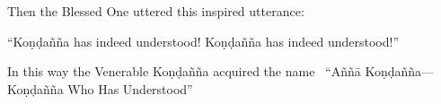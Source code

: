 \begin{english-only-hang}
  Then the Blessed One uttered this inspired utterance:
\end{english-only-hang}

\begin{english-only-hang}
  ``Koṇḍañña has indeed understood! Koṇḍañña has indeed understood!''
\end{english-only-hang}

\begin{english-only-hang}
  In this way the Venerable Koṇḍañña acquired the name \breathmark\ ``Aññā Koṇḍañña—Koṇḍañña Who Has Understood''
\end{english-only-hang}

\suttaRef{[SN 56.11]}
